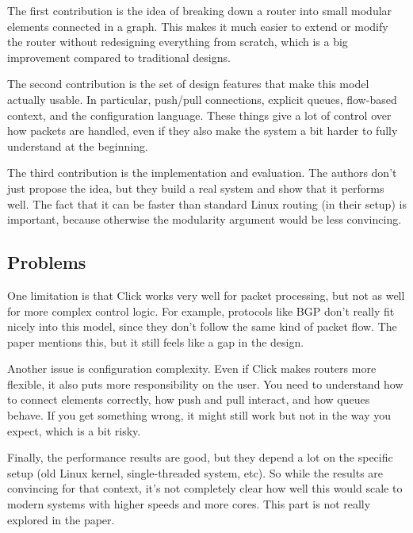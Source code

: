 \documentclass[a4paper, 12pt]{article}
\begin{document}
The first contribution is the idea of breaking down a router into small modular elements connected in a graph. This makes it much easier to extend or modify the router without redesigning everything from scratch, which is a big improvement compared to traditional designs.

The second contribution is the set of design features that make this model actually usable. In particular, push/pull connections, explicit queues, flow-based context, and the configuration language. These things give a lot of control over how packets are handled, even if they also make the system a bit harder to fully understand at the beginning.

The third contribution is the implementation and evaluation. The authors don't just propose the idea, but they build a real system and show that it performs well. The fact that it can be faster than standard Linux routing (in their setup) is important, because otherwise the modularity argument would be less convincing.

\subsection{Problems}

One limitation is that Click works very well for packet processing, but not as well for more complex control logic. For example, protocols like BGP don't really fit nicely into this model, since they don't follow the same kind of packet flow. The paper mentions this, but it still feels like a gap in the design.

Another issue is configuration complexity. Even if Click makes routers more flexible, it also puts more responsibility on the user. You need to understand how to connect elements correctly, how push and pull interact, and how queues behave. If you get something wrong, it might still work but not in the way you expect, which is a bit risky.

Finally, the performance results are good, but they depend a lot on the specific setup (old Linux kernel, single-threaded system, etc). So while the results are convincing for that context, it's not completely clear how well this would scale to modern systems with higher speeds and more cores. This part is not really explored in the paper.
\end{document}
